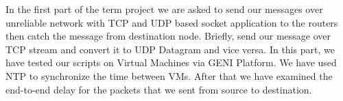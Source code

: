 In the first part of the term project we are asked to send our messages over unreliable network with TCP and UDP based socket application to the routers then catch the message from destination node. Briefly, send our message over TCP stream and convert it to UDP Datagram and vice versa. In this part, we have tested our scripts on Virtual Machines via GENI Platform. We have used NTP to synchronize the time between VMs. After that we have examined the end-to-end delay for the packets that we sent from source to destination.
